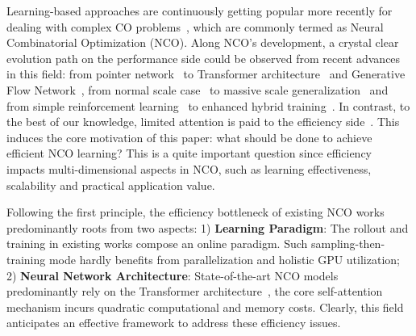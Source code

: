 \documentclass{article}
\theoremstyle{plain}
\theoremstyle{definition}
\theoremstyle{remark}
\begin{document}
Learning-based approaches are continuously getting popular more recently for dealing with complex CO problems~\cite{nco-2016-start}, which are commonly termed as Neural Combinatorial Optimization (NCO). Along NCO's development, a crystal clear evolution path on the performance side could be observed from recent advances in this field:  from pointer network~\cite{1} to Transformer architecture~\cite{transformer} and Generative Flow Network~\cite{flow-network}, from normal scale case~\cite{3} to massive scale generalization~\cite{boosting} and from simple reinforcement learning~\cite{4} to enhanced hybrid training~\cite{GFlowNet}. In contrast, to the best of our knowledge, limited attention is paid to the efficiency side~\cite{efficient-nco-1,efficient-nco-2}. This induces the core motivation of this paper: what should be done to achieve efficient NCO learning? This is a quite important question since efficiency impacts multi-dimensional aspects in NCO, such as learning effectiveness, scalability and practical application value.


Following the first principle, the efficiency bottleneck of existing NCO works predominantly roots from two aspects: 1) \textbf{Learning Paradigm}: The rollout and training in existing works compose an online paradigm. Such sampling-then-training mode hardly benefits from parallelization and holistic GPU utilization; 2) \textbf{Neural Network Architecture}: State-of-the-art NCO models predominantly rely on the Transformer architecture~\cite{transformer}, the core self-attention mechanism incurs quadratic computational and memory costs. Clearly, this field anticipates an effective framework to address these efficiency issues.
\end{document}
